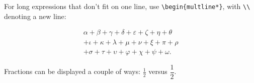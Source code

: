 \documentclass[11pt]{article}
\begin{document}
For long expressions that don't fit on one line, use
\verb~\begin{multline*}~, with \verb~\\~ denoting a new line:

\begin{multline*}
  \alpha + \beta + \gamma + \delta + \varepsilon + \zeta + \eta + \theta   \\
  + \iota + \kappa + \lambda + \mu + \nu + \xi + \pi + \rho \\
  + \sigma + \tau + \upsilon + \varphi + \chi + \psi + \omega.
\end{multline*}

Fractions can be displayed a couple of ways: \(\frac{1}{2}\) versus \(\dfrac{1}{2}\).
\end{document}

